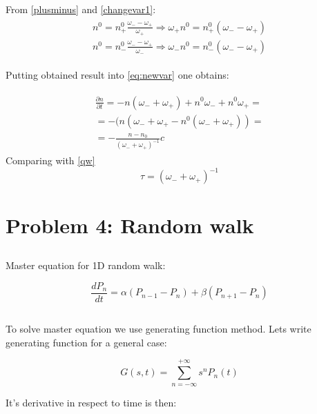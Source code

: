 \documentclass[10pt]{article}
\begin{document}
From \ref{plusminus} and \ref{changevar1}:
\begin{align}
\begin{split}
n^0 = n_{+}^0\frac{\omega_{-}-\omega_{+}}{\omega_{+}} \Rightarrow \omega_{+}n^0 =n_{+}^0(\omega_{-}-\omega_{+}) \\
n^0 = n_{-}^0\frac{\omega_{-}-\omega_{+}}{\omega_{-}} \Rightarrow \omega_{-}n^0 = n_{-}^0(\omega_{-}-\omega_{+})
\label{eq:newvar2}
\end{split}
\end{align}

Putting obtained result into \ref{eq:newvar} one obtains:

\begin{align}
\begin{split}
\frac{\partial n}{\partial t} = -n(\omega_{-} + \omega_{+}) + n^0\omega_{-} + n^0\omega_{+} = \\
= -(n(\omega_{-} + \omega_{+} - n^0(\omega_{-} + \omega_{+})) = \\
= - \frac{n - n_0}{(\omega_{-} + \omega_{+})^{-1}}
c
\end{split}
\end{align}
Comparing with \ref{qw}
\begin{equation}\label{changevar123}
\tau = (\omega_{-} + \omega_{+})^{-1}
\end{equation}

\section{Problem 4: Random walk}
\subsection{}
Master equation for 1D random walk:

\begin{equation}
\frac{d P_n}{dt} = \alpha(P_{n-1} - P_n) +\beta(P_{n+1} - P_n)
\end{equation}
\subsection{}
To solve master equation we use generating function method. Lets write generating function for a general case:

\begin{equation}
G(s,t) = \sum_{n=-\infty}^{+\infty} s^n P_n(t)
\end{equation}

It's derivative in respect to time is then:
\end{document}
